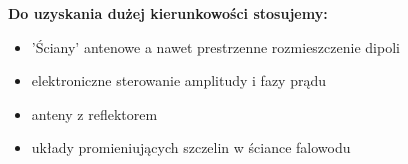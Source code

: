 \begin{solution}
\textbf{Do uzyskania dużej kierunkowości stosujemy:}\\
\begin{itemize}
\item 'Ściany' antenowe a nawet prestrzenne rozmieszczenie dipoli
\item elektroniczne sterowanie amplitudy i fazy prądu
\item anteny z reflektorem
\item układy promieniujących szczelin w ściance falowodu
\end{itemize}

\end{solution}